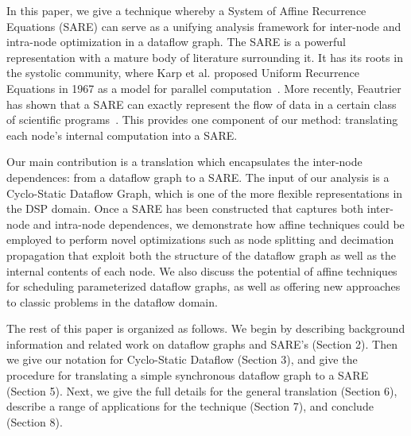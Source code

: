 In this paper, we give a technique whereby a System of Affine
Recurrence Equations (SARE) can serve as a unifying analysis framework
for inter-node and intra-node optimization in a dataflow graph.  The
SARE is a powerful representation with a mature body of literature
surrounding it.  It has its roots in the systolic community, where
Karp et al. proposed Uniform Recurrence Equations in 1967 as a model
for parallel computation~\cite{Karp67}.  More recently, Feautrier has
shown that a SARE can exactly represent the flow of data in a certain
class of scientific programs~\cite{Feautrier91,Feautrier01}.  This
provides one component of our method: translating each node's internal
computation into a SARE.

Our main contribution is a translation which encapsulates the
inter-node dependences: from a dataflow graph to a SARE.  The input of
our analysis is a Cyclo-Static Dataflow Graph, which is one of the
more flexible representations in the DSP domain. Once a SARE has been
constructed that captures both inter-node and intra-node dependences,
we demonstrate how affine techniques could be employed to perform
novel optimizations such as node splitting and decimation propagation
that exploit both the structure of the dataflow graph as well as the
internal contents of each node.  We also discuss the potential of
affine techniques for scheduling parameterized dataflow graphs, as
well as offering new approaches to classic problems in the dataflow
domain.

The rest of this paper is organized as follows.  We begin by
describing background information and related work on dataflow graphs
and SARE's (Section 2).  Then we give our notation for Cyclo-Static
Dataflow (Section 3), and give the procedure for translating a simple
synchronous dataflow graph to a SARE (Section 5).  Next, we give the
full details for the general translation (Section 6), describe a range
of applications for the technique (Section 7), and conclude (Section
8).  
